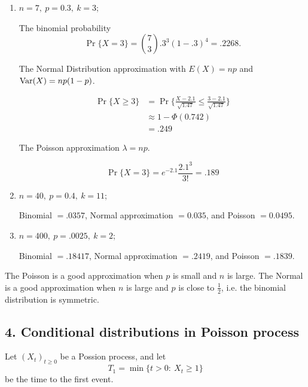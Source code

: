 \documentclass{tufte-book}
\begin{document}
\begin{enumerate}
\item $n = 7, \ p=0.3, \ k=3$;

The binomial probability
\[ \Pr\{X=3\} = \binom{7}{3} .3^3 (1-.3)^4 = .2268. \]

The Normal Distribution approximation with $E(X) = np$ and $\operatorname{Var}(X) = np(1-p)$.

\begin{align*}
\Pr\{ X \geq 3 \} &= \Pr\{ \frac{X - 2.1}{\sqrt{1.47}} \leq \frac{3-2.1}{\sqrt{1.47}} \} \\
&\approx  1 - \Phi(0.742) \\
&= .249
\end{align*}

The Poisson approximation $\lambda = np$.

\[ \Pr\{X = 3\} = e^{-2.1} \frac{2.1^3}{3!} = .189 \]

\item $n=40, \ p=0.4, \ k=11$;

Binomial $=.0357$, Normal approximation $=0.035$, and Poisson $=0.0495$.

\item $n=400, \ p=.0025, \ k=2$;

Binomial $=.18417$, Normal approximation $=.2419$, and Poisson $=.1839$.

\end{enumerate}

The Poisson is a good approximation when $p$ is small and $n$ is large.  The Normal is a good approximation when $n$ is large and $p$ is close to $\frac{1}{2}$, i.e. the binomial distribution is symmetric.


\subsection{4. Conditional distributions in Poisson process}

Let $(X_t)_{t\geq 0}$ be a Possion process, and let
\[ T_1 = \min\{ t> 0: \ X_t \geq 1 \} \]
be the time to the first event.
\end{document}
